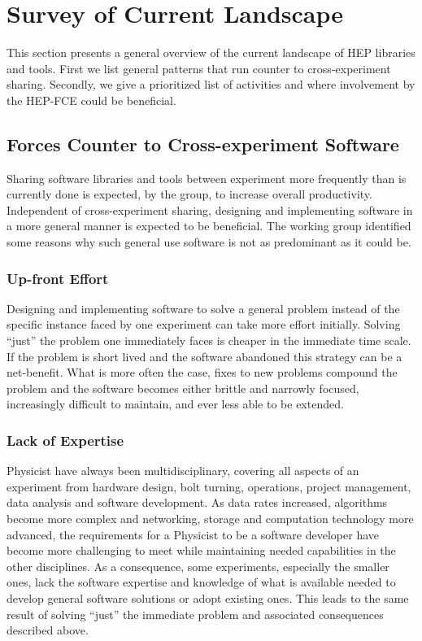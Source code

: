 \section{Survey of Current Landscape}


This section presents a general overview of the current landscape of
HEP libraries and tools.  
%
First we list general patterns that run counter to cross-experiment sharing.
%
%
Secondly, we give a prioritized list of activities and where involvement 
by the HEP-FCE could be beneficial.

\subsection{Forces Counter to Cross-experiment Software}
\label{subsec:pitfalls}

Sharing software libraries and tools between experiment more
frequently than is currently done is expected, by the group, to
increase overall productivity.  Independent of cross-experiment
sharing, designing and implementing software in a more general manner
is expected to be beneficial.  The working group
identified some reasons why such general use software is not as
predominant as it could be.

\subsubsection{Up-front Effort}

Designing and implementing software to solve a general problem instead
of the specific instance faced by one experiment can take more effort
initially.  Solving ``just'' the problem one immediately faces is
cheaper in the immediate time scale.  If the problem is short lived
and the software abandoned this strategy can be a net-benefit.  What
is more often the case, fixes to new problems compound the problem and
the software becomes either brittle and narrowly focused, increasingly
difficult to maintain, and ever less able to be extended.

\subsubsection{Lack of Expertise}

Physicist have always been multidisciplinary, covering all aspects of
an experiment from hardware design, bolt turning, operations, project
management, data analysis and software development.  As data rates
increased, algorithms become more complex and networking, storage and
computation technology more advanced, the requirements for a Physicist to
be a software developer have become more challenging to meet while
maintaining needed capabilities in the other
disciplines.  As a consequence, some experiments, especially the smaller
ones, lack the software expertise and knowledge of what is available
needed to develop general software solutions or adopt existing ones.
This leads to the same result of solving ``just'' the immediate
problem and associated consequences described above.

